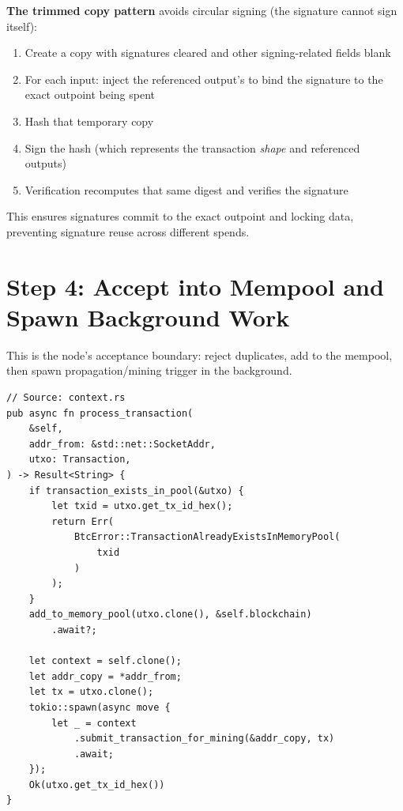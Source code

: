 \begin{notebox}
\textbf{The trimmed copy pattern} avoids circular signing (the signature cannot sign itself):
\begin{enumerate}
  \item Create a copy with signatures cleared and other signing-related fields blank
  \item For each input: inject the referenced output's  to bind the signature to the exact outpoint being spent
  \item Hash that temporary copy
  \item Sign the hash (which represents the transaction \emph{shape} and referenced outputs)
  \item Verification recomputes that same digest and verifies the signature
\end{enumerate}

This ensures signatures commit to the exact outpoint and locking data, preventing signature reuse across different spends.
\end{notebox}

\section{Step 4: Accept into Mempool and Spawn Background Work}
\label{sec:ch09-5-step4}

This is the node's acceptance boundary: reject duplicates, add to the mempool, then spawn propagation/mining trigger in the background.

\begin{listing}[htbp]
\caption{ --- mempool acceptance}
\label{lst:ch09-5-5}
\begin{verbatim}
// Source: context.rs
pub async fn process_transaction(
    &self,
    addr_from: &std::net::SocketAddr,
    utxo: Transaction,
) -> Result<String> {
    if transaction_exists_in_pool(&utxo) {
        let txid = utxo.get_tx_id_hex();
        return Err(
            BtcError::TransactionAlreadyExistsInMemoryPool(
                txid
            )
        );
    }
    add_to_memory_pool(utxo.clone(), &self.blockchain)
        .await?;

    let context = self.clone();
    let addr_copy = *addr_from;
    let tx = utxo.clone();
    tokio::spawn(async move {
        let _ = context
            .submit_transaction_for_mining(&addr_copy, tx)
            .await;
    });
    Ok(utxo.get_tx_id_hex())
}
\end{verbatim}
\end{listing}

